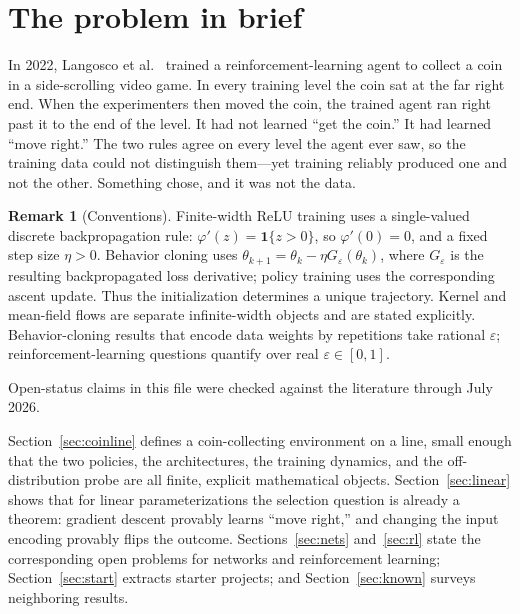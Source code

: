 \documentclass[11pt]{amsart}
\theoremstyle{plain}
\theoremstyle{definition}
\newtheorem{remark}[theorem]{Remark}
\begin{document}
\section{The problem in brief}\label{sec:brief}

In 2022, Langosco et al.~\cite{langosco2022} trained a reinforcement-learning agent to collect a coin in a side-scrolling video game. In every training level the coin sat at the far right end. When the experimenters then moved the coin, the trained agent ran right past it to the end of the level. It had not learned ``get the coin.'' It had learned ``move right.'' The two rules agree on every level the agent ever saw, so the training data could not distinguish them---yet training reliably produced one and not the other. Something chose, and it was not the data.



\begin{remark}[Conventions]
\label{rem:conventions}
Finite-width ReLU training uses a single-valued discrete backpropagation rule: $\varphi'(z)=\mathbf1\{z>0\}$, so $\varphi'(0)=0$, and a fixed step size $\eta>0$. Behavior cloning uses $\theta_{k+1}=\theta_k-\eta G_\varepsilon(\theta_k)$, where $G_\varepsilon$ is the resulting backpropagated loss derivative; policy training uses the corresponding ascent update. Thus the initialization determines a unique trajectory. Kernel and mean-field flows are separate infinite-width objects and are stated explicitly. Behavior-cloning results that encode data weights by repetitions take rational $\varepsilon$; reinforcement-learning questions quantify over real $\varepsilon\in[0,1]$.
\end{remark}

Open-status claims in this file were checked against the literature through July 2026.

Section~\ref{sec:coinline} defines a coin-collecting environment on a line, small enough that the two policies, the architectures, the training dynamics, and the off-distribution probe are all finite, explicit mathematical objects. Section~\ref{sec:linear} shows that for linear parameterizations the selection question is already a theorem: gradient descent provably learns ``move right,'' and changing the input encoding provably flips the outcome. Sections~\ref{sec:nets} and~\ref{sec:rl} state the corresponding open problems for networks and reinforcement learning; Section~\ref{sec:start} extracts starter projects; and Section~\ref{sec:known} surveys neighboring results.
\end{document}
